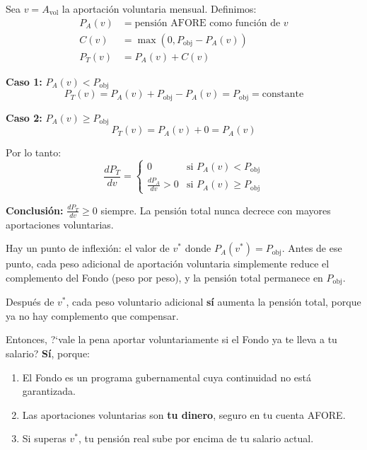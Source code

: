 \documentclass[11pt,a4paper]{report}
\theoremstyle{remark}
\begin{document}
\begin{tcolorbox}[colback=blue!5!white, colframe=blue!75!black, title=\textbf{Definici\'on Formal}]
Sea $v = A_{\text{vol}}$ la aportaci\'on voluntaria mensual. Definimos:
\begin{align}
P_A(v) &= \text{pensi\'on AFORE como funci\'on de } v \\
C(v) &= \max(0, P_{\text{obj}} - P_A(v)) \\
P_T(v) &= P_A(v) + C(v)
\end{align}

\textbf{Caso 1:} $P_A(v) < P_{\text{obj}}$
\begin{equation}
P_T(v) = P_A(v) + P_{\text{obj}} - P_A(v) = P_{\text{obj}} = \text{constante}
\end{equation}

\textbf{Caso 2:} $P_A(v) \geq P_{\text{obj}}$
\begin{equation}
P_T(v) = P_A(v) + 0 = P_A(v)
\end{equation}

Por lo tanto:
\begin{equation}
\frac{dP_T}{dv} = \begin{cases}
0 & \text{si } P_A(v) < P_{\text{obj}} \\
\frac{dP_A}{dv} > 0 & \text{si } P_A(v) \geq P_{\text{obj}}
\end{cases}
\label{eq:derivada_complemento}
\end{equation}

\textbf{Conclusi\'on:} $\frac{dP_T}{dv} \geq 0$ siempre. La pensi\'on total nunca decrece con mayores aportaciones voluntarias.
\end{tcolorbox}

\begin{tcolorbox}[colback=green!5!white, colframe=green!50!black, title=\textbf{Intuici\'on}]
Hay un punto de inflexi\'on: el valor de $v^*$ donde $P_A(v^*) = P_{\text{obj}}$. Antes de ese punto, cada peso adicional de aportaci\'on voluntaria simplemente reduce el complemento del Fondo (peso por peso), y la pensi\'on total permanece en $P_{\text{obj}}$.

Despu\'es de $v^*$, cada peso voluntario adicional \textbf{s\'i} aumenta la pensi\'on total, porque ya no hay complemento que compensar.

Entonces, ?`vale la pena aportar voluntariamente si el Fondo ya te lleva a tu salario? \textbf{S\'i}, porque:
\begin{enumerate}
  \item El Fondo es un programa gubernamental cuya continuidad no est\'a garantizada.
  \item Las aportaciones voluntarias son \textbf{tu dinero}, seguro en tu cuenta AFORE.
  \item Si superas $v^*$, tu pensi\'on real sube por encima de tu salario actual.
\end{enumerate}
\end{tcolorbox}
\end{document}
